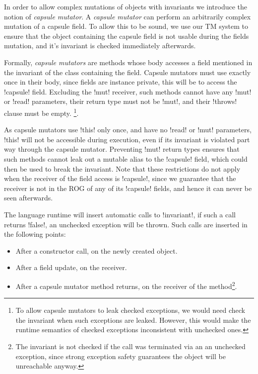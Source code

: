 In order to allow complex mutations of objects with invariants we introduce the notion of \emph{capsule mutator}. A \emph{capsule mutator} can perform an arbitrarily complex mutation of a capsule field. To allow this to be sound, we use our TM system to ensure that the object containing the capsule field is not usable during the fields mutation, and it's invariant is checked immediately afterwards. 

Formally, \emph{capsule mutators} are \Q@mut@ methods whose body accesses a \Q@capsule@ field mentioned in the invariant of the class containing the field. 
Capsule mutators must use \Q@this@ exactly once in their body, since fields are instance private, this will be to access the \Q!capsule! field.
Excluding the \Q!mut! receiver, such methods cannot have any \Q!mut! or \Q!read! parameters, their return type must not be \Q!mut!, and their \Q!throws! clause must be empty.%
\footnote{%
To allow capsule mutators to leak checked exceptions,
we would need check the invariant
when such exceptions are leaked. However, this would make the runtime semantics of checked exceptions inconsistent with unchecked ones.}.


As capsule mutators use \Q!this! only once, and have no \Q!read! or \Q!mut! parameters, \Q!this! will not be accessible during execution, even if its invariant is violated part way through the capsule mutator.
Preventing \Q!mut! return types ensures that such methods cannot leak out a mutable alias to the \Q!capsule! field, which could then be used to break the invariant.
Note that these restrictions do not apply when the receiver of the field access is \Q!capsule!, since we guarantee that the receiver is not in the ROG of any of its \Q!capsule! fields, and hence it can never be seen afterwards.

The language runtime will insert automatic calls to \Q!invariant!, if such a call returns \Q!false!, an unchecked exception will be thrown. Such calls are inserted in the following points:
\begin{itemize}
	\item After a constructor call, on the newly created object.
	\item After a field update, on the receiver.
	\item After a capsule mutator method returns, on the receiver of the method\footnote{The invariant is not checked if the call was terminated via an an unchecked exception, since strong exception safety guarantees the object will be unreachable anyway.}.
\end{itemize}

